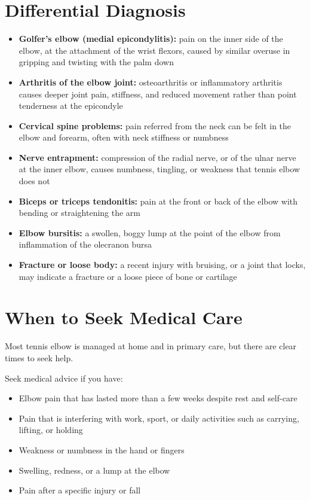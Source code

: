 \section*{Differential Diagnosis}
\begin{itemize}
    \item \textbf{Golfer's elbow (medial epicondylitis):} pain on the inner side of the elbow, at the attachment of the wrist flexors, caused by similar overuse in gripping and twisting with the palm down
    \item \textbf{Arthritis of the elbow joint:} osteoarthritis or inflammatory arthritis causes deeper joint pain, stiffness, and reduced movement rather than point tenderness at the epicondyle
    \item \textbf{Cervical spine problems:} pain referred from the neck can be felt in the elbow and forearm, often with neck stiffness or numbness
    \item \textbf{Nerve entrapment:} compression of the radial nerve, or of the ulnar nerve at the inner elbow, causes numbness, tingling, or weakness that tennis elbow does not
    \item \textbf{Biceps or triceps tendonitis:} pain at the front or back of the elbow with bending or straightening the arm
    \item \textbf{Elbow bursitis:} a swollen, boggy lump at the point of the elbow from inflammation of the olecranon bursa
    \item \textbf{Fracture or loose body:} a recent injury with bruising, or a joint that locks, may indicate a fracture or a loose piece of bone or cartilage
\end{itemize}

\section*{When to Seek Medical Care}
Most tennis elbow is managed at home and in primary care, but there are clear times to seek help.

Seek medical advice if you have:
\begin{itemize}
    \item Elbow pain that has lasted more than a few weeks despite rest and self-care
    \item Pain that is interfering with work, sport, or daily activities such as carrying, lifting, or holding
    \item Weakness or numbness in the hand or fingers
    \item Swelling, redness, or a lump at the elbow
    \item Pain after a specific injury or fall
\end{itemize}

